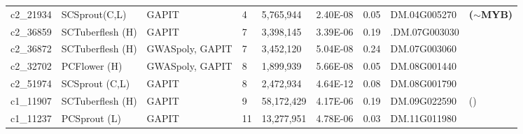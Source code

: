 \documentclass[pdflatex,sn-mathphys-ay]{sn-jnl}%
\begin{document}
\begin{landscape}
\begin{table}[]
\begin{tabular}{lllllllll}
\rowcolor[HTML]{FFFFD7} 
c2\_21934                        & SCSprout(C,L)                          & GAPIT                           & 4                        & 5,765,944                         & 2.40E-08                        & 0.05                        & DM.04G005270                        & \textbf{($\sim$MYB)}\citep{sharma2024genotyping,riveros2022uncovering}                      \\
c2\_36859                        & SCTuberflesh (H)                        & GAPIT                           & 7                        & 3,398,145                         & 3.39E-06                        & 0.19                        & .DM.07G003030                        &                                                                              \\
c2\_36872                        & SCTuberflesh (H)                        & GWASpoly, GAPIT                 & 7                        & 3,452,120                         & 5.04E-08                        & 0.24                        & DM.07G003060                        &                                                                              \\
c2\_32702                        & PCFlower (H)                            & GWASpoly, GAPIT                 & 8                        & 1,899,939                         & 5.66E-08                        & 0.05                        & DM.08G001440                        &                                                                              \\
c2\_51974                        & SCSprout (C,L)                          & GAPIT                           & 8                        & 2,472,934                         & 4.64E-12                        & 0.08                        & DM.08G001790                        &                                                                              \\
\rowcolor[HTML]{FFFFD7} 
c1\_11907                        & SCTuberflesh (H)                        & GAPIT                           & 9                        & 58,172,429                        & 4.17E-06                        & 0.19                        & DM.09G022590                        &  () \citep{parra2021pathway}                                                                           \\
c1\_11237                        & PCSprout (L)                            & GAPIT                           & 11                       & 13,277,951                        & 4.78E-06                        & 0.03                        & DM.11G011980                        &                                                                              \\

\end{tabular}
\end{table}
\end{landscape}
\end{document}
